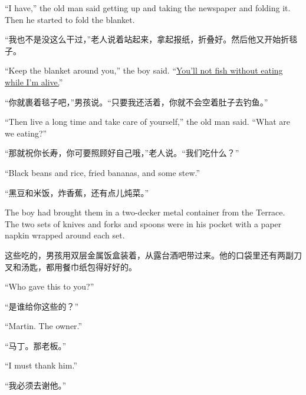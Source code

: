 \begin{paracol}{2}
``I have,'' the old man said getting up and taking the newspaper and \gls{folding} it. Then he started to fold the blanket.

\switchcolumn

“我也不是没这么干过，”老人说着站起来，拿起报纸，折叠好。然后他又开始折毯子。

\switchcolumn*

``Keep the blanket around you,'' the boy said. ``\uline{You'll not fish without
eating while I'm alive.}''

\switchcolumn

“你就裹着毯子吧，”男孩说。“只要我还活着，你就不会空着肚子去钓鱼。”

\switchcolumn*

``Then live a long time and take care of yourself,'' the old man said. ``What are we eating?''

\switchcolumn

“那就祝你长寿，你可要照顾好自己哦，”老人说。“我们吃什么？”

\switchcolumn*

``Black beans and rice, \gls{fried} bananas, and some \gls{stew}.''

\switchcolumn

“黑豆和米饭，炸香蕉，还有点儿炖菜。”

\switchcolumn*

The boy had brought them in a two\gls{-decker} metal container from the
Terrace. The two \gls{sets} of knives and forks and \glspl{spoon} were in his pocket with
a paper \gls{napkin} wrapped around each set.

\switchcolumn

这些吃的，男孩用双层金属饭盒装着，从露台酒吧带过来。他的口袋里还有两副刀叉和汤匙，都用餐巾纸包得好好的。

\switchcolumn*

``Who gave this to you?''

\switchcolumn

“是谁给你这些的？”

\switchcolumn*

``Martin. The owner.''

\switchcolumn

“马丁。那老板。”

\switchcolumn*

``I must thank him.''

\switchcolumn

“我必须去谢他。”

\switchcolumn*


\end{paracol}
